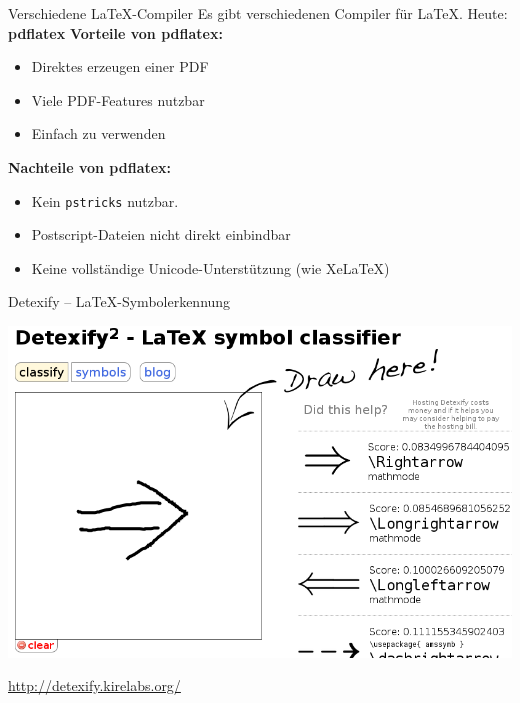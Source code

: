 \documentclass{beamer}
\newcommand{\slideheading}[1]{\textbf{#1}\\}
\begin{document}
		
		\begin{frame}{Verschiedene \LaTeX{}-Compiler}
			Es gibt verschiedenen Compiler für \LaTeX{}. Heute: \textbf{pdflatex}
			\vspace{0.2cm}
			\slideheading{Vorteile von pdflatex:}
			\begin{itemize}
				\item Direktes erzeugen einer PDF
				\item Viele PDF-Features nutzbar
				\item Einfach zu verwenden
			\end{itemize}
			\vspace{0.1cm}
			\slideheading{Nachteile von pdflatex:}
			\begin{itemize}
				\item Kein \texttt{pstricks} nutzbar.
				\item Postscript-Dateien nicht direkt einbindbar
				\item Keine vollständige Unicode-Unterstützung (wie Xe\LaTeX)
			\end{itemize}
		\end{frame}
		
		
		\begin{frame}{Detexify -- \LaTeX-Symbolerkennung}
			\begin{center}
				\includegraphics[width=0.95\textheight]{images/detexify}
				\vspace{0.3cm}
				
				\Large \href{http://detexify.kirelabs.org/}{http://detexify.kirelabs.org/}
			\end{center}
		\end{frame}
		
\end{document}
